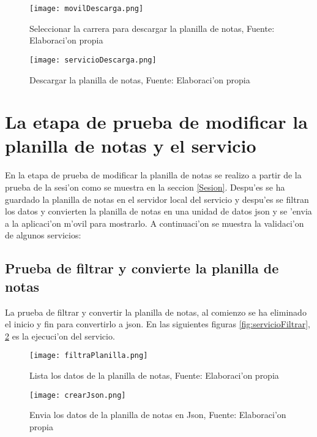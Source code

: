 \begin{figure}[H]
\begin{minipage}{0.48\textwidth}
\centering
\texttt{[image: movilDescarga.png]}
\caption{Seleccionar la carrera para descargar la planilla de notas, Fuente: Elaboraci'on propia}
\label{fig:movilDescargar}
\end{minipage}\hfill
\begin {minipage}{0.48\textwidth}
\centering
\texttt{[image: servicioDescarga.png]}
\caption{Descargar la planilla de notas, Fuente: Elaboraci'on propia}
\label{fig:servicioDescargar}
\end{minipage}
\end{figure}

\section{La etapa de prueba de modificar la planilla de notas y el servicio}
En la etapa de prueba de modificar la planilla de notas se realizo a partir de la  prueba de la sesi'on como se muestra  en la seccion \ref{Sesion}. Despu'es se ha  guardado la planilla de notas en el servidor local del servicio y despu'es se filtran los datos y  convierten la planilla de notas en una unidad de datos json y se 'envia a la aplicaci'on m'ovil para mostrarlo. A  continuaci'on se muestra la validaci'on de algunos servicios: 

\subsection{Prueba de filtrar y convierte la planilla de notas}
La prueba de filtrar y convertir la planilla de notas, al comienzo se ha eliminado el inicio y fin para convertirlo a json. En las siguientes figuras \ref{fig:servicioFiltrar}, \ref{fig:crearJson} es la ejecuci'on del servicio.
\begin{figure}[H]
\begin{minipage}{0.48\textwidth}
\centering
\texttt{[image: filtraPlanilla.png]}
\caption{Lista los datos de la planilla de notas, Fuente: Elaboraci'on propia}
\label{fig:servicioFiltrar}
\end{minipage}\hfill
\begin {minipage}{0.48\textwidth}
\centering
\texttt{[image: crearJson.png]}
\caption{Envia los datos de la planilla de notas en Json, Fuente: Elaboraci'on propia}
\label{fig:crearJson}
\end{minipage}
\end{figure}

